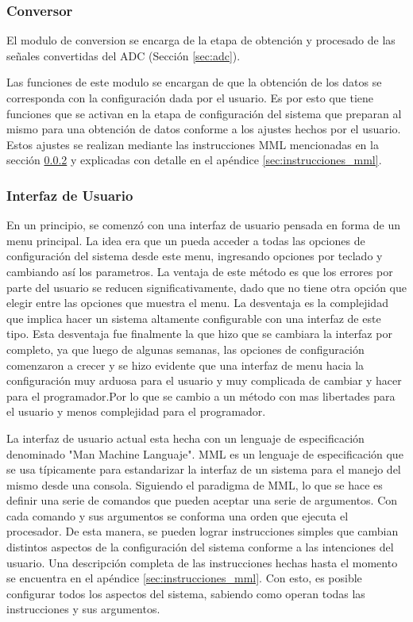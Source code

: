 \documentclass{article}
\theoremstyle{definition}
\theoremstyle{remark}
\begin{document}

\subsubsection{Conversor} %
\label{ssub:conversor}

El modulo de conversion se encarga de la etapa de obtención y procesado de las señales convertidas del ADC (Sección \ref{sec:adc}).

Las funciones de este modulo se encargan de que la obtención de los datos se corresponda con la configuración dada por el usuario. Es por esto que tiene funciones que se activan en la etapa de configuración del sistema que preparan al mismo para una obtención de datos conforme a los ajustes hechos por el usuario. Estos ajustes se realizan mediante las instrucciones MML mencionadas en la sección \ref{ssub:interfaz_de_usuario} y explicadas con detalle en el apéndice \ref{sec:instrucciones_mml}.


\subsubsection{Interfaz de Usuario} %
\label{ssub:interfaz_de_usuario}

En un principio, se comenzó con una interfaz de usuario pensada en forma de un menu principal. La idea era que un pueda acceder a todas las opciones de configuración del sistema desde este menu, ingresando opciones por teclado y cambiando así los parametros. La ventaja de este método es que los errores por parte del usuario se reducen significativamente, dado que no tiene otra opción que elegir entre las opciones que muestra el menu. La desventaja es la complejidad que implica hacer un sistema altamente configurable con una interfaz de este tipo. Esta desventaja fue finalmente la que hizo que se cambiara la interfaz por completo, ya que luego de algunas semanas, las opciones de configuración comenzaron a crecer y se hizo evidente que una interfaz de menu hacia la configuración muy arduosa para el usuario y muy complicada de cambiar y hacer para el programador.Por lo que se cambio a un método con mas libertades para el usuario y menos complejidad para el programador.

La interfaz de usuario actual esta hecha con un lenguaje de especificación denominado "Man Machine Languaje". MML es un lenguaje de especificación que se usa típicamente para estandarizar la interfaz de un sistema para el manejo del mismo desde una consola. Siguiendo el paradigma de MML, lo que se hace es definir una serie de comandos que pueden aceptar una serie de argumentos. Con cada comando y sus argumentos se conforma una orden que ejecuta el procesador. De esta manera, se pueden lograr instrucciones simples que cambian distintos aspectos de la configuración del sistema conforme a las intenciones del usuario. Una descripción completa de las instrucciones hechas hasta el momento se encuentra en el apéndice \ref{sec:instrucciones_mml}. Con esto, es posible configurar todos los aspectos del sistema, sabiendo como operan todas las instrucciones y sus argumentos.
\end{document}
